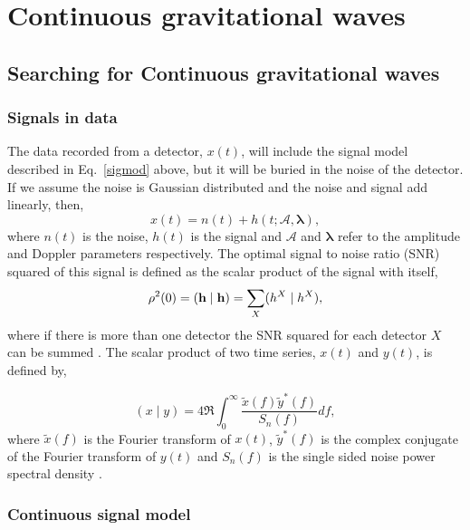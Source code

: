 \chapter{Continuous gravitational waves}


\section{\label{intro:search}Searching for Continuous gravitational waves}

\subsection{\label{intro:search:signals} Signals in data}

The data recorded from a detector, $x(t)$, will include the signal model described in Eq.~\ref{sigmod} above, but it will be buried in the noise of the detector. 
If we assume the noise is Gaussian distributed and the noise and signal add linearly, then,  
\begin{equation}
\label{signalinnoise}
x(t) = n(t) + h(t; \mathcal{A},{\boldsymbol \lambda}) ,
\end{equation}
where $n(t)$ is the noise, $h(t)$ is the signal and $\mathcal{A}$ and ${\boldsymbol \lambda}$ refer to the amplitude and Doppler parameters respectively. 
The optimal signal to noise ratio (SNR) squared of this signal is defined as the scalar product of the signal with itself,
\begin{equation}
\rho^2(0) = ({\bf h} \mid {\bf h}) = \sum_X(h^X \mid h^X),
\end{equation}
where if there is more than one detector the SNR squared for each detector $X$ can be summed \cite{Prix2007}. 
The scalar product of two time series, $x(t)$ and $y(t)$, is defined by,

\begin{equation}
\label{intro:search:signals:scalarproduct}
(x \mid y) = 4 \Re \int_{0}^{\infty} \frac{\tilde{x}(f)\tilde{y}^{*}(f)}{S_n(f)}df,
\end{equation}
where $\tilde{x}(f)$ is the Fourier transform of $x(t)$, $\tilde{y}^{*}(f)$ is the complex conjugate of the Fourier transform of $y(t)$ and $S_n(f)$ is the single sided noise power spectral density \cite{Prix2007}.


\subsection{\label{intro:search:model}Continuous signal model}

